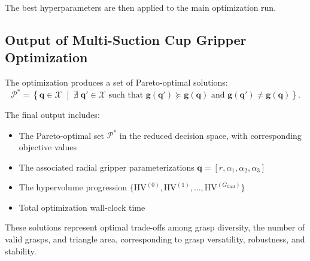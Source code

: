 The best hyperparameters are then applied to the main optimization run.

\subsection{Output of Multi-Suction Cup Gripper Optimization}

The optimization produces a set of Pareto-optimal solutions:
\begin{equation}
    \mathcal{P}^*
    =
    \left\{
        \mathbf{q} \in \mathcal{X}
        \;\middle|\;
        \nexists\; \mathbf{q}' \in \mathcal{X}
        \text{ such that }
        \mathbf{g}(\mathbf{q}') \succeq \mathbf{g}(\mathbf{q})
        \text{ and }
        \mathbf{g}(\mathbf{q}') \neq \mathbf{g}(\mathbf{q})
    \right\}.
\end{equation}

The final output includes:
\begin{itemize}
    \item The Pareto-optimal set $\mathcal{P}^*$ in the reduced decision space, with corresponding
    objective values
    \item The associated radial gripper parameterizations $\mathbf{q} =
    [r,\alpha_1,\alpha_2,\alpha_3]$
    \item The hypervolume progression $\{\mathrm{HV}^{(0)},\mathrm{HV}^{(1)},\dots,\mathrm{HV}^{(G_{\mathrm{final}})}\}$
    \item Total optimization wall-clock time
\end{itemize}


These solutions represent optimal trade-offs among grasp diversity, the number of valid grasps,
and triangle area, corresponding to grasp versatility, robustness, and stability.